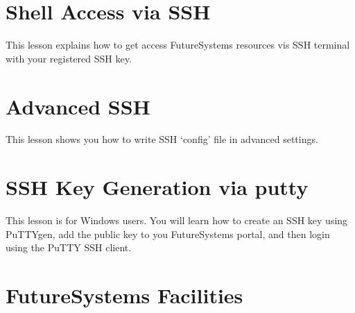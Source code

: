 \section{Shell Access via SSH}

This lesson explains how to get access FutureSystems resources vis SSH
terminal with your registered SSH key.


\section{Advanced SSH}

This lesson shows you how to write SSH `config' file in advanced
settings.


\section{SSH Key Generation via putty}

This lesson is for Windows users. You will learn how to create an SSH
key using PuTTYgen, add the public key to you FutureSystems portal,
and then login using the PuTTY SSH client.

\section{FutureSystems Facilities}\label{S:fs-facilities}

